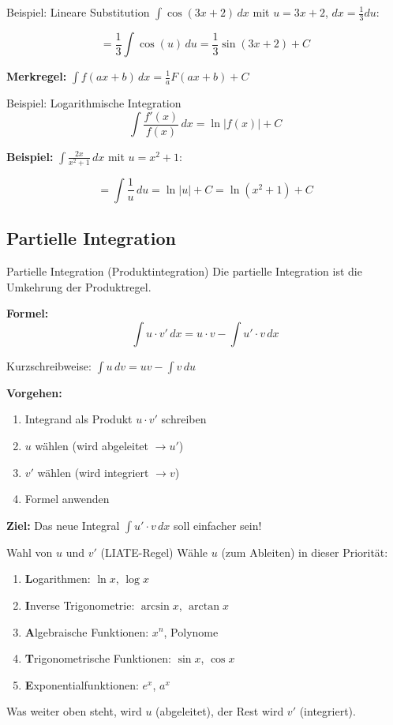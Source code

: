 \documentclass[a4paper,fontsize = 7pt]{scrartcl}
\begin{document}
\begin{subbox}{Beispiel: Lineare Substitution}
$\int \cos(3x + 2)\,dx$ mit $u = 3x + 2$, $dx = \frac{1}{3}du$:

$$= \frac{1}{3}\int \cos(u)\,du = \frac{1}{3}\sin(3x + 2) + C$$

\textbf{Merkregel:} $\int f(ax + b)\,dx = \frac{1}{a} F(ax + b) + C$
\end{subbox}

\begin{subbox}{Beispiel: Logarithmische Integration}
$$\int \frac{f'(x)}{f(x)}\,dx = \ln|f(x)| + C$$

\textbf{Beispiel:} $\int \frac{2x}{x^2 + 1}\,dx$ mit $u = x^2 + 1$:

$$= \int \frac{1}{u}\,du = \ln|u| + C = \ln(x^2 + 1) + C$$
\end{subbox}

\subsection{Partielle Integration}

\begin{mainbox}{Partielle Integration (Produktintegration)}
Die partielle Integration ist die Umkehrung der Produktregel.

\textbf{Formel:}
$$\boxed{\int u \cdot v'\,dx = u \cdot v - \int u' \cdot v\,dx}$$

Kurzschreibweise: $\int u\,dv = uv - \int v\,du$

\textbf{Vorgehen:}
\begin{enumerate}
	\item Integrand als Produkt $u \cdot v'$ schreiben
	\item $u$ wählen (wird abgeleitet $\to u'$)
	\item $v'$ wählen (wird integriert $\to v$)
	\item Formel anwenden
\end{enumerate}

\textbf{Ziel:} Das neue Integral $\int u' \cdot v\,dx$ soll einfacher sein!
\end{mainbox}

\begin{subbox}{Wahl von $u$ und $v'$ (LIATE-Regel)}
Wähle $u$ (zum Ableiten) in dieser Priorität:
\begin{enumerate}
	\item \textbf{L}ogarithmen: $\ln x$, $\log x$
	\item \textbf{I}nverse Trigonometrie: $\arcsin x$, $\arctan x$
	\item \textbf{A}lgebraische Funktionen: $x^n$, Polynome
	\item \textbf{T}rigonometrische Funktionen: $\sin x$, $\cos x$
	\item \textbf{E}xponentialfunktionen: $e^x$, $a^x$
\end{enumerate}

Was weiter oben steht, wird $u$ (abgeleitet), der Rest wird $v'$ (integriert).
\end{subbox}
\end{document}
